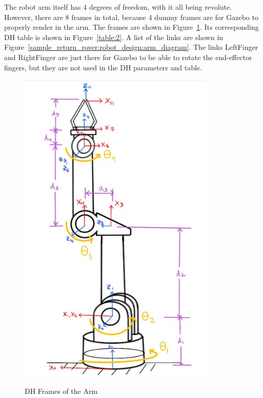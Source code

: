 The robot arm itself has 4 degrees of freedom, with it all being revolute. However, there are 8 frames in total, because 4 dummy frames are for Gazebo to properly render in the arm. The frames are shown in Figure~\ref{sample_return_rover:robot_design:arm_frames}. Its corresponding DH table is shown in Figure~\ref{table:2}. A list of the links are shown in Figure~\ref{sample_return_rover:robot_design:arm_diagram}. The links LeftFinger and RightFinger are just there for Gazebo to be able to rotate the end-effector fingers, but they are not used in the DH parameters and table.
\begin{figure}[H]
	\centering
	\includegraphics[scale=0.6]{sections/robot-design/images/arm_frames.png}
	\label{sample_return_rover:robot_design:arm_frames}
	\caption{DH Frames of the Arm}
\end{figure}

